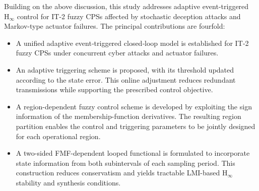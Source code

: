 \documentclass[preprint,review,fleqn,sort&compress,3p]{elsarticle}
\theoremstyle{definition} %
\theoremstyle{definition}%
\begin{document}
Building on the above discussion, this study addresses adaptive event-triggered
$\mathrm{H}_\infty$ control for IT-2 fuzzy CPSs affected by stochastic deception
attacks and Markov-type actuator failures. The principal contributions are fourfold:

\begin{itemize}
	\item[1)] A unified adaptive event‑triggered closed‑loop model is established for IT‑2 fuzzy CPSs under concurrent cyber attacks and actuator failures.
	\item[2)] An adaptive triggering scheme is proposed, with its threshold updated according to the state error. This online adjustment reduces redundant transmissions while supporting the prescribed control objective.
	\item[3)] A region-dependent fuzzy control scheme is developed by exploiting the sign information of the membership-function derivatives. The resulting region partition enables the control and triggering parameters to be jointly designed for each operational region.
	\item[4)] A two-sided FMF-dependent looped functional is formulated to incorporate state information from both subintervals of each sampling period. This construction reduces conservatism and yields tractable LMI-based $\mathrm{H}_\infty$ stability and synthesis conditions.
\end{itemize}

\end{document}
